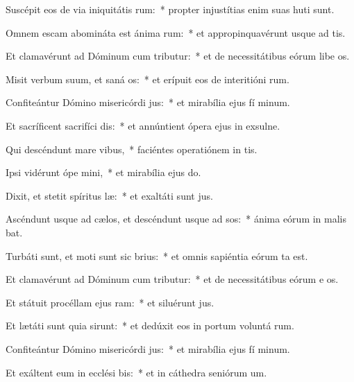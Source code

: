 \item Suscépit eos de via iniquitátis rum:~* propter injustítias enim suas huti sunt.
\item Omnem escam abomináta est ánima rum:~* et appropinquavérunt usque ad  tis.
\item Et clamavérunt ad Dóminum cum tributur:~* et de necessitátibus eórum libe os.
\item Misit verbum suum, et saná os:~* et erípuit eos de interitióni rum.
\item Confiteántur Dómino misericórdi jus:~* et mirabília ejus fí minum.
\item Et sacríficent sacrifíci dis:~* et annúntient ópera ejus in exsulne.
\item Qui descéndunt mare  vibus,~* faciéntes operatiónem in  tis.
\item Ipsi vidérunt ópe mini,~* et mirabília ejus  do.
\item Dixit, et stetit spíritus læ:~* et exaltáti sunt  jus.
\item Ascéndunt usque ad cælos, et descéndunt usque ad sos:~* ánima eórum in malis bat.
\item Turbáti sunt, et moti sunt sic brius:~* et omnis sapiéntia eórum ta est.
\item Et clamavérunt ad Dóminum cum tributur:~* et de necessitátibus eórum e os.
\item Et státuit procéllam ejus  ram:~* et siluérunt  jus.
\item Et lætáti sunt quia sirunt:~* et dedúxit eos in portum voluntá rum.
\item Confiteántur Dómino misericórdi jus:~* et mirabília ejus fí minum.
\item Et exáltent eum in ecclési bis:~* et in cáthedra seniórum  um.
